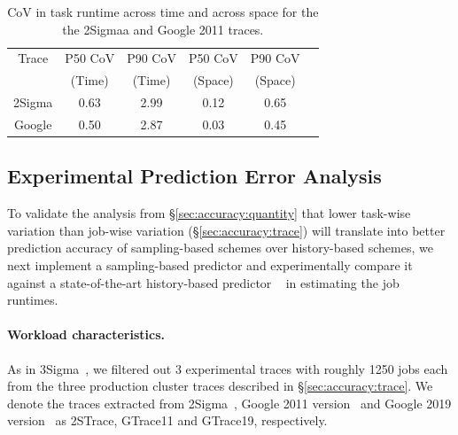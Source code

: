 \begin{table}[tp]
  \caption{CoV in task runtime across time and across space for the
	the 2Sigmaa and Google 2011 traces.}
\label{table:accuracy:trace_analysis:covs}
\centering
{\small
\vspace{-0.1in}
\begin{tabular}{|c|c|c|c|c|c|}
\hline
                 Trace       & P50 CoV & P90 CoV & P50 CoV & P90 CoV \\
			& (Time)  & (Time)& (Space) & (Space) \\
\hline
	2Sigma & 0.63 & 2.99 & 0.12 & 0.65 \\
\hline
	Google & 0.50 & 2.87 & 0.03 & 0.45 \\
\hline
\end{tabular}
}
\vspace{-0.1in}
\end{table}

\subsection{Experimental Prediction Error Analysis}
\label{sec:accuracy:experiment}

To validate the analysis from \S\ref{sec:accuracy:quantity} 
that lower task-wise variation than job-wise
variation (\S\ref{sec:accuracy:trace}) will translate into better
prediction accuracy of sampling-based schemes over history-based
schemes, we next implement a sampling-based predictor \slearn and
experimentally compare it against a state-of-the-art history-based
predictor \primarybasepredict~\cite{3Sigma} in estimating the job
runtimes.

\paragraph{Workload characteristics.}
As in 3Sigma~\cite{3Sigma},
we filtered out 3
experimental traces with roughly 1250 jobs each
from the three production cluster traces described in
\S\ref{sec:accuracy:trace}.
We denote the traces extracted
from 2Sigma~\cite{2Sigma:website}, Google 2011 version~\cite{googleTraceGithub}
and Google 2019 version~\cite{googleClusterData2019} 
as 2STrace, GTrace11 and GTrace19, respectively.

